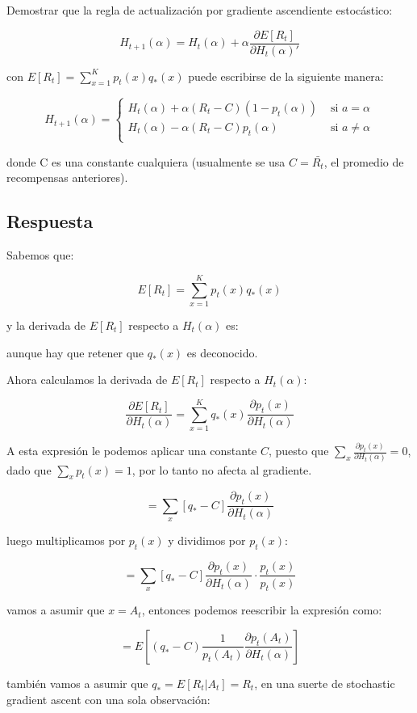\documentclass[12pt,a4paper]{article}
\begin{document}
Demostrar que la regla de actualización por gradiente ascendiente
estocástico:

$$ H_{t+1}(\alpha) = H_t(\alpha) + \alpha \frac{\partial E[R_t]}{\partial H_t(\alpha)'}$$

con $E[R_t] = \sum_{x=1}^{K} p_t(x)q_*(x)$ puede escribirse de la siguiente manera:

$$ H_{t+1}(\alpha) = 
\begin{cases} 
    H_t(\alpha) + \alpha (R_t - C)(1 - p_t(\alpha)) & \text{ si } a = \alpha \\
    H_t(\alpha) - \alpha (R_t - C)p_t(\alpha) & \text{ si } a \neq \alpha \\
\end{cases} $$

donde C es una constante cualquiera (usualmente se usa $C = \bar{R_t}$,
el promedio de recompensas anteriores).

\subsection{Respuesta}

Sabemos que:

$$ E[R_t] = \sum_{x=1}^{K} p_t(x)q_*(x) $$

y la derivada de $E[R_t]$ respecto a $H_t(\alpha)$ es:

aunque hay que retener que $q_*(x)$ es deconocido.

Ahora calculamos la derivada de $E[R_t]$ respecto a $H_t(\alpha)$:

$$ \frac{\partial E[R_t]}{\partial H_t(\alpha)} = \sum_{x=1}^{K} q_*(x) \frac{\partial p_t(x)}{\partial H_t(\alpha)} $$

A esta expresión le podemos aplicar una constante $C$, 
puesto que $\sum_x \frac{\partial p_t(x)}{\partial H_t(\alpha)} = 0$, dado que 
$\sum_x p_t(x) = 1$, por lo tanto no afecta al gradiente.

$$ = \sum_x [q_* -C] \frac{\partial p_t(x)}{\partial H_t(\alpha)} $$

luego multiplicamos por $p_t(x)$ y dividimos por $p_t(x)$:

$$ = \sum_x [q_* -C] \frac{\partial p_t(x)}{\partial H_t(\alpha)} \cdot \frac{p_t(x)}{p_t(x)} $$

vamos a asumir que $x=A_t$, entonces podemos reescribir la expresión como:

$$ = E[(q_* -C) \frac{1}{p_t(A_t)} \frac{\partial p_t(A_t)}{\partial H_t(\alpha)}] $$

también vamos a asumir que $q_* = E[R_t | A_t] = R_t$, en una suerte de stochastic gradient ascent con una sola observación:
\end{document}
